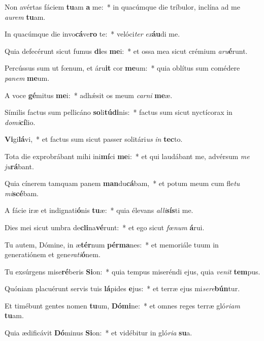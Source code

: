 \item Non avértas fáciem \textbf{tu}am \textbf{a} me:~* in quacúmque die tríbulor, inclína ad me \textit{au}\textit{rem} \textbf{tu}am.
\item In quacúmque die invo\textbf{cá}ve\textbf{ro} te:~* velóci\textit{ter} \textit{ex}\textbf{áu}di me.
\item Quia defecérunt sicut fumus \textbf{di}es \textbf{me}i:~* et ossa mea sicut crémium \textit{a}\textit{ru}\textbf{é}runt.
\item Percússus sum ut fœnum, et áru\textbf{it} cor \textbf{me}um:~* quia oblítus sum comédere \textit{pa}\textit{nem} \textbf{me}um.
\item A voce \textbf{gé}mitus \textbf{me}i:~* adhǽsit os meum \textit{car}\textit{ni} \textbf{me}æ.
\item Símilis factus sum pellicáno \textbf{so}li\textbf{tú}\textbf{di}nis:~* factus sum sicut nyctícorax in \textit{do}\textit{mi}\textbf{cí}lio.
\item \textbf{Vi}gi\textbf{lá}vi,~* et factus sum sicut passer solitári\textit{us} \textit{in} \textbf{tec}to.
\item Tota die exprobrábant mihi ini\textbf{mí}ci \textbf{me}i:~* et qui laudábant me, advérsum \textit{me} \textit{ju}\textbf{rá}bant.
\item Quia cínerem tamquam panem \textbf{man}du\textbf{cá}bam,~* et potum meum cum fle\textit{tu} \textit{mi}\textbf{scé}bam.
\item A fácie iræ et indignati\textbf{ó}nis \textbf{tu}æ:~* quia élevans \textit{al}\textit{li}\textbf{sís}ti me.
\item Dies mei sicut umbra de\textbf{cli}na\textbf{vé}runt:~* et ego sicut \textit{fœ}\textit{num} \textbf{á}rui.
\item Tu autem, Dómine, in æ\textbf{tér}num \textbf{pér}\textbf{ma}nes:~* et memoriále tuum in generatiónem et gene\textit{ra}\textit{ti}\textbf{ó}nem.
\item Tu exsúrgens mise\textbf{ré}beris \textbf{Si}on:~* quia tempus miseréndi ejus, quia \textit{ve}\textit{nit} \textbf{tem}pus.
\item Quóniam placuérunt servis tuis \textbf{lá}pides \textbf{e}jus:~* et terræ ejus mi\textit{se}\textit{re}\textbf{bún}tur.
\item Et timébunt gentes nomen \textbf{tu}um, \textbf{Dó}\textbf{mi}ne:~* et omnes reges terræ gló\textit{ri}\textit{am} \textbf{tu}am.
\item Quia ædificávit \textbf{Dó}minus \textbf{Si}on:~* et vidébitur in gló\textit{ri}\textit{a} \textbf{su}a.
